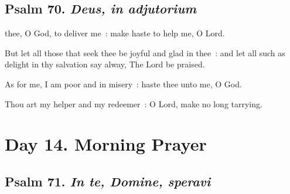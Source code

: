 \subsection{Psalm 70. \textit{Deus, in adjutorium}}

 thee, O God, to deliver me~: make haste to help me, O Lord.\par
{}
But let all those that seek thee be joyful and glad in thee~: and let all such as delight in thy salvation say alway, The Lord be praised.\par
{}As for me, I am poor and in misery~: haste thee unto me, O God.\par
{}Thou art my helper and my redeemer~: O Lord, make no long tarrying.\par

\section*{Day 14. Morning Prayer}

\subsection{Psalm 71. \textit{In te, Domine, speravi}}

